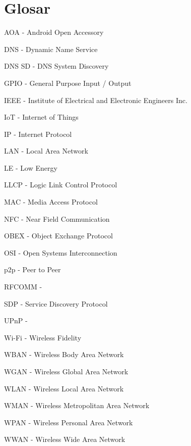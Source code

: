 \documentclass[12pt,a4paper]{article}
\begin{document}
    \section{Glosar}
    	\begin{list}{}{}
        \item AOA - Android Open Accessory
        \item DNS - Dynamic Name Service
        \item DNS SD - DNS System Discovery
        \item GPIO - General Purpose Input / Output
        \item IEEE - Institute of Electrical and Electronic Engineers Inc.
        \item IoT - Internet of Things
        \item IP - Internet Protocol
        \item LAN - Local Area Network
        \item LE - Low Energy
        \item LLCP - Logic Link Control Protocol
        \item MAC - Media Access Protocol
        \item NFC - Near Field Communication
        \item OBEX - Object Exchange Protocol
        \item OSI - Open Systems Interconnection
        \item p2p - Peer to Peer
        \item RFCOMM - 
        \item SDP - Service Discovery Protocol
        \item UPnP - 
        \item Wi-Fi - Wireless Fidelity
        \item WBAN - Wireless Body Area Network
        \item WGAN - Wireless Global Area Network
        \item WLAN - Wireless Local Area Network
        \item WMAN - Wireless Metropolitan Area Network
        \item WPAN - Wireless Personal Area Network
        \item WWAN - Wireless Wide Area Network
        \end {list}
\end{document}
